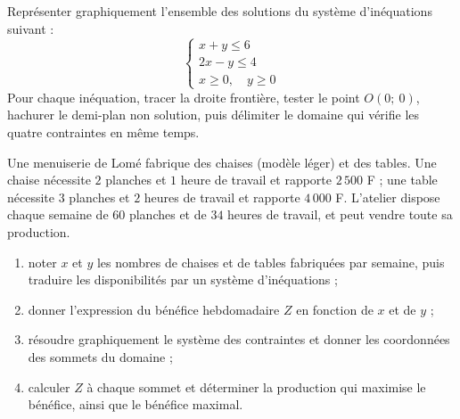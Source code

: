 \begin{exercice}
Représenter graphiquement l'ensemble des solutions du système d'inéquations suivant :
\[
\begin{cases}
x + y \leqslant 6\\
2x - y \leqslant 4\\
x \geqslant 0, \quad y \geqslant 0
\end{cases}
\]
Pour chaque inéquation, tracer la droite frontière, tester le point $O(0;\ 0)$, hachurer le demi-plan non solution, puis délimiter le domaine qui vérifie les quatre contraintes en même temps.
\end{exercice}

\begin{exercice}
Une menuiserie de Lomé fabrique des chaises (modèle léger) et des tables. Une chaise nécessite $2$ planches et $1$ heure de travail et rapporte $2\,500$ F ; une table nécessite $3$ planches et $2$ heures de travail et rapporte $4\,000$ F. L'atelier dispose chaque semaine de $60$ planches et de $34$ heures de travail, et peut vendre toute sa production.
\begin{enumerate}
\item noter $x$ et $y$ les nombres de chaises et de tables fabriquées par semaine, puis traduire les disponibilités par un système d'inéquations ;
\item donner l'expression du bénéfice hebdomadaire $Z$ en fonction de $x$ et de $y$ ;
\item résoudre graphiquement le système des contraintes et donner les coordonnées des sommets du domaine ;
\item calculer $Z$ à chaque sommet et déterminer la production qui maximise le bénéfice, ainsi que le bénéfice maximal.
\end{enumerate}
\end{exercice}
